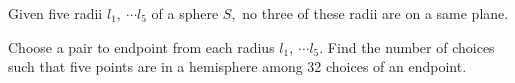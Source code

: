 Given five radii $l_1,\ \cdots l_5$ of a sphere $S,$ no three of these radii are on a same plane.

Choose a pair to endpoint from each radius $l_1,\ \cdots l_5.$ Find the number of choices such that five points are in a hemisphere among 32 choices of an endpoint.